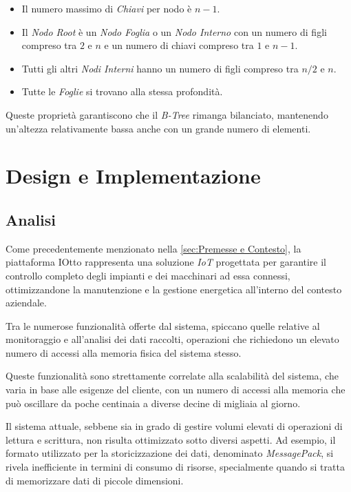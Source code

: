 \documentclass[12pt,a4paper,openright,twoside]{book}
\begin{document}
        \begin{itemize}
            \item Il numero massimo di \textit{Chiavi} per nodo è \( n - 1 \).
            \item Il \textit{Nodo Root} è un \textit{Nodo Foglia} o un \textit{Nodo Interno} con un numero di figli compreso tra \( 2 \) e \( n \) e un numero di chiavi compreso tra \( 1 \) e \( n - 1 \).
            \item Tutti gli altri \textit{Nodi Interni} hanno un numero di figli compreso tra \( n / 2 \) e \( n \).
            \item Tutte le \textit{Foglie} si trovano alla stessa profondità.
        \end{itemize}

        Queste proprietà garantiscono che il \textit{B-Tree} rimanga bilanciato, mantenendo un'altezza relativamente bassa anche con un grande numero di elementi.

\chapter{Design e Implementazione}

    \section{Analisi}

        Come precedentemente menzionato nella \cref{sec:Premesse e Contesto}, la piattaforma IOtto rappresenta una soluzione \textit{IoT} progettata per garantire il controllo completo degli impianti e dei macchinari ad essa connessi, ottimizzandone la manutenzione e la gestione energetica all'interno del contesto aziendale.

        Tra le numerose funzionalità offerte dal sistema, spiccano quelle relative al monitoraggio e all'analisi dei dati raccolti, operazioni che richiedono un elevato numero di accessi alla memoria fisica del sistema stesso.

        Queste funzionalità sono strettamente correlate alla scalabilità del sistema, che varia in base alle esigenze del cliente, con un numero di accessi alla memoria che può oscillare da poche centinaia a diverse decine di migliaia al giorno.

        Il sistema attuale, sebbene sia in grado di gestire volumi elevati di operazioni di lettura e scrittura, non risulta ottimizzato sotto diversi aspetti. Ad esempio, il formato utilizzato per la storicizzazione dei dati, denominato \textit{MessagePack}, si rivela inefficiente in termini di consumo di risorse, specialmente quando si tratta di memorizzare dati di piccole dimensioni.
\end{document}
